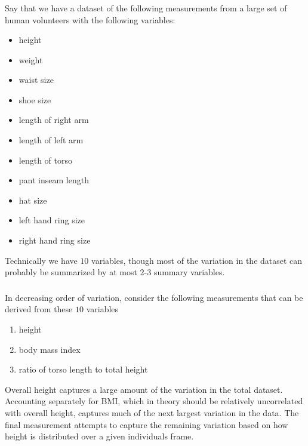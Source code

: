 \documentclass[xetex,mathserif,serif,aspectratio=169]{beamer}
\begin{document}
\begin{frame}[fragile] \frametitle{}  \oldB \footnotesize


Say that we have a dataset of the following measurements from
a large set of human volunteers with the following variables:
\begin{itemize}
\item height
\item weight
\item waist size
\item shoe size
\item length of right arm
\item length of left arm
\item length of torso
\item pant inseam length
\item hat size
\item left hand ring size
\item right hand ring size
\end{itemize}
Technically we have $10$ variables, though most of the variation
in the dataset can probably be summarized by at most 2-3 summary variables.

\end{frame}

\begin{frame}[fragile] \frametitle{}  \oldB \small


In decreasing order of variation, consider the following measurements
that can be derived from these $10$ variables
\begin{enumerate}
\item height
\item body mass index
\item ratio of torso length to total height
\end{enumerate}
Overall height captures a large amount of the variation in the total
dataset. Accounting separately for BMI, which in theory should be
relatively uncorrelated with overall height, captures much of the
next largest variation in the data. The final measurement attempts
to capture the remaining variation based on how height is distributed
over a given individuals frame.

\end{frame}
\end{document}
